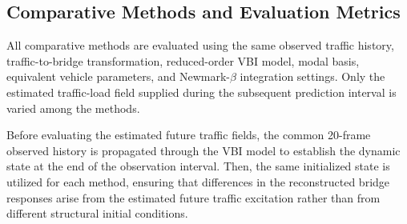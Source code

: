 \documentclass[journal]{IEEEtran}
\begin{document}
\subsection{Comparative Methods and Evaluation Metrics}

All comparative methods
are evaluated using the same observed traffic history, traffic-to-bridge
transformation, reduced-order VBI model, modal basis, equivalent vehicle
parameters, and Newmark-$\beta$ integration settings. Only the estimated
traffic-load field supplied during the subsequent prediction interval is varied
among the methods.

Before evaluating the
estimated future traffic fields, the common 20-frame observed history is
propagated through the VBI model to establish the dynamic state at the end of
the observation interval. Then, the same initialized state is utilized for each
method, ensuring that differences in the reconstructed bridge responses arise
from the estimated future traffic excitation rather than from different
structural initial conditions.
\end{document}
